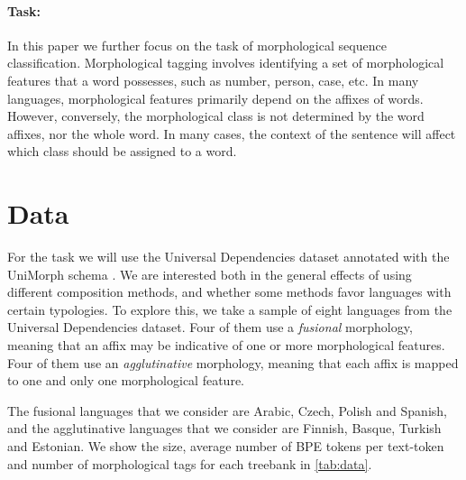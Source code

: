 \documentclass[11pt]{article}
\newcommand\jp[1]{(\textbf{JP:} #1)}
\begin{document}
        \paragraph{Task:} In this paper we further focus on the task
        of morphological sequence classification. Morphological
        tagging involves identifying a set of morphological features
        that a word possesses, such as number, person, case, etc. In
        many languages, morphological features primarily depend on the
        affixes of words. However, conversely, the morphological class
        is not determined by the word affixes, nor the whole word. In
        many cases, the context of the sentence will affect which
        class should be assigned to a word.

    \section{Data}
    
        For the task we will use the Universal Dependencies dataset
     \citep{nivre2018} annotated with the UniMorph schema
     \citep{mccarthy2018marrying}. We are interested both in the
     general effects of using different composition methods, and
     whether some methods favor languages with certain typologies. To
     explore this, we take a sample of eight languages from the
     Universal Dependencies dataset. Four of them use a
     \textit{fusional} morphology, meaning that an affix may be
     indicative of one or more morphological features. Four of them
     use an \textit{agglutinative} morphology, meaning that each affix
     is mapped to one and only one morphological feature.

    
           	The fusional languages that we consider are Arabic, Czech,
     Polish and Spanish, and the agglutinative languages that we
     consider are Finnish, Basque, Turkish and Estonian.  We show the
     size, average number of BPE tokens per text-token and number of
     morphological tags for each treebank in \cref{tab:data}.
    

    
    
\end{document}
